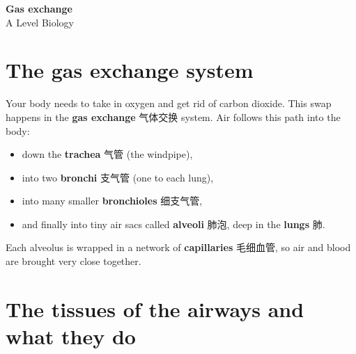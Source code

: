 \documentclass[11pt]{article}
\begin{document}
\begin{center}
  {\LARGE\bfseries Gas exchange}\\[0.35em]
  {\large A Level Biology}
\end{center}
\vspace{0.6em}

\section*{The gas exchange system}

Your body needs to take in oxygen and get rid of carbon dioxide. This swap happens in the \textbf{gas exchange} 气体交换 system. Air follows this path into the body:

\begin{itemize}
\item down the \textbf{trachea} 气管 (the windpipe),

\item into two \textbf{bronchi} 支气管 (one to each lung),

\item into many smaller \textbf{bronchioles} 细支气管,

\item and finally into tiny air sacs called \textbf{alveoli} 肺泡, deep in the \textbf{lungs} 肺.

\end{itemize}

Each alveolus is wrapped in a network of \textbf{capillaries} 毛细血管, so air and blood are brought very close together.

\section*{The tissues of the airways and what they do}
\end{document}

